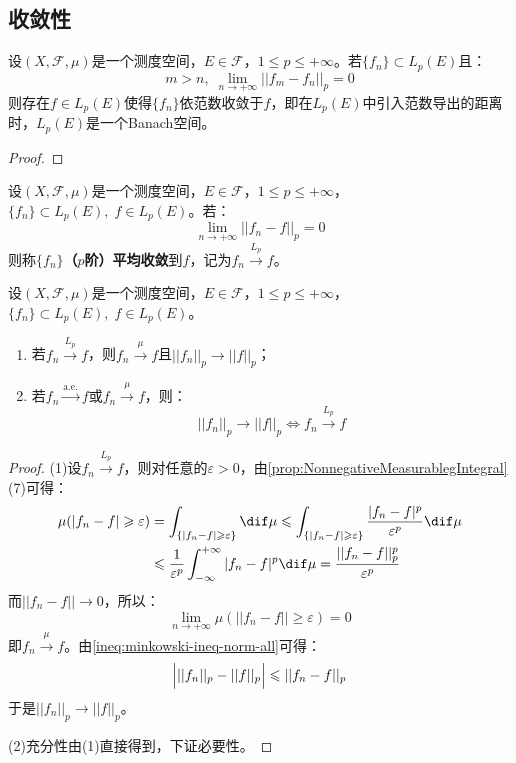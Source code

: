 \subsection{收敛性}
\begin{theorem}
	设$(X,\mathscr{F},\mu)$是一个测度空间，$E\in\mathscr{F}$，$1\leqslant p\leqslant+\infty$。若$\{f_n\}\subset L_p(E)$且：
	\begin{equation*}
		m>n,\;\lim_{n\to+\infty}||f_m-f_n||_p=0
	\end{equation*}
	则存在$f\in L_p(E)$使得$\{f_n\}$依范数收敛于$f$，即在$L_p(E)$中引入范数导出的距离时，$L_p(E)$是一个Banach空间。
\end{theorem}
\begin{proof}
	
\end{proof}
\begin{definition}
	设$(X,\mathscr{F},\mu)$是一个测度空间，$E\in\mathscr{F}$，$1\leqslant p\leqslant+\infty$，$\{f_n\}\subset L_p(E),\;f\in L_p(E)$。若：
	\begin{equation*}
		\lim_{n\to+\infty}||f_n-f||_p=0
	\end{equation*}
	则称$\{f_n\}$\textbf{（$p$阶）平均收敛}到$f$，记为$f_n\overset{L_p}{\longrightarrow}f$。
\end{definition}
\begin{theorem}
	设$(X,\mathscr{F},\mu)$是一个测度空间，$E\in\mathscr{F}$，$1\leqslant p\leqslant+\infty$，$\{f_n\}\subset L_p(E),\;f\in L_p(E)$。
	\begin{enumerate}
		\item 若$f_n\overset{L_p}{\longrightarrow}f$，则$f_n\overset{\mu}{\longrightarrow}f$且$||f_n||_p\to||f||_p$；
		\item 若$f_n\overset{\text{a.e.}}{\longrightarrow}f$或$f_n\overset{\mu}{\longrightarrow}f$，则：
		\begin{equation*}
			||f_n||_p\to||f||_p\Leftrightarrow f_n\overset{L_p}{\longrightarrow}f
		\end{equation*}
	\end{enumerate}
\end{theorem}
\begin{proof}
	(1)设$f_n\overset{L_p}{\longrightarrow}f$，则对任意的$\varepsilon>0$，由\cref{prop:NonnegativeMeasurablegIntegral}(7)可得：
	\begin{align*}
		\mu(|f_n-f|\geqslant\varepsilon)
		&=\int_{\{|f_n-f|\geqslant\varepsilon\}}^{}\dif\mu\leqslant\int_{\{|f_n-f|\geqslant\varepsilon\}}^{}\frac{|f_n-f|^p}{\varepsilon^p}\dif\mu \\
		&\leqslant\frac{1}{\varepsilon^p}\int_{-\infty}^{+\infty}|f_n-f|^p\dif\mu=\frac{||f_n-f||^p_p}{\varepsilon^p}
	\end{align*}
	而$||f_n-f||\to0$，所以：
	\begin{equation*}
		\lim_{n\to+\infty}\mu(||f_n-f||\geqslant\varepsilon)=0
	\end{equation*}
	即$f_n\overset{\mu}{\longrightarrow}f$。由\cref{ineq:minkowski-ineq-norm-all}可得：
	\begin{equation*}
		\Bigl|||f_n||_p-||f||_p\Bigr|\leqslant||f_n-f||_p
	\end{equation*}
	于是$||f_n||_p\to||f||_p$。\par
	(2)充分性由(1)直接得到，下证必要性。
\end{proof}